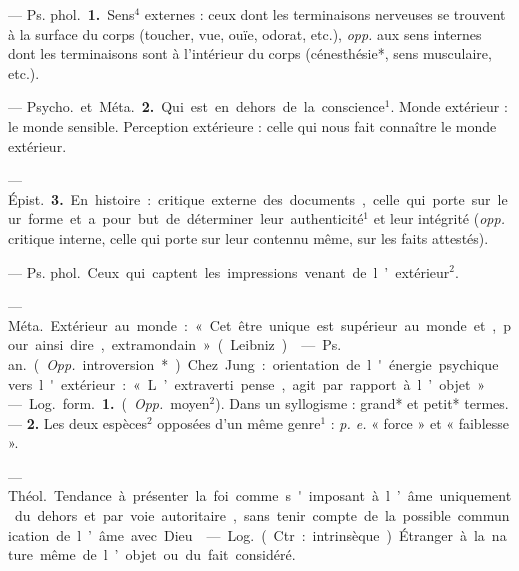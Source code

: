 \begin{itemize}[leftmargin=1cm, label=, itemsep=1pt]
 — \si{Ps. phol.} {\bf 1.}
Sens$^4$ externes : ceux dont les terminaisons nerveuses se trouvent à
la surface du corps (toucher, vue,
ouïe, odorat, etc.), {\it opp.} aux sens
internes dont les terminaisons sont
à l'intérieur du corps (cénesthésie*,
sens musculaire, etc.).

— \si{Psycho.} et \si{Méta.} {\bf 2.} Qui est en
dehors de la conscience$^1$. Monde
extérieur : le monde sensible. Perception extérieure : celle qui nous fait
connaître le monde extérieur.

— \si{Épist.} {\bf 3.} En histoire : critique
externe des documents, celle qui
porte sur leur forme et a pour but
de déterminer leur authenticité$^1$ et
leur intégrité ({\it opp.} critique interne,
celle qui porte sur leur contennu
même, sur les faits attestés).

 — \si{Ps. phol.}
Ceux qui captent les impressions
venant de l’extérieur$^2$.

 — \si{Méta.} Extérieur au
monde : « Cet être unique est supérieur au monde et, pour ainsi dire,
extramondain » (Leibniz).

 — \si{Ps. an.} ({\it Opp.}
introversion*) Chez Jung : orientation de l'énergie psychique vers
l'extérieur : « L’extraverti pense,
agit par rapport à l’objet. »

 — \si{Log.} \si{form.} {\bf 1.} ({\it Opp.}
moyen$^2$). Dans un syllogisme : grand*
et petit* termes. — {\bf 2.} Les deux
espèces$^2$ opposées d’un même genre$^1$ :
{\it p. e.} « force » et « faiblesse ».

 — \si{Théol.} Tendance à
présenter la foi comme s'imposant à
l’âme uniquement du dehors et par
voie autoritaire, sans tenir compte de
la possible communication de l’âme
avec Dieu.

 — \si{Log.} (Ctr. :
intrinsèque) Étranger à la nature même
de l’objet ou du fait considéré.

	\end{itemize}
